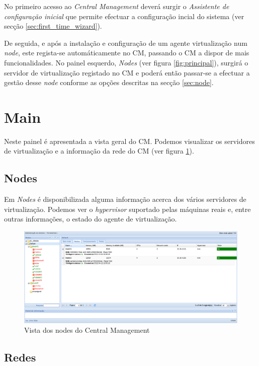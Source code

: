 No primeiro acesso ao \emph{Central Management} deverá surgir o \emph{Assistente de configuração inicial} que permite efectuar a configuração incial do sistema (ver secção \ref{sec:first_time_wizard}).

De seguida, e após a instalação e configuração de um agente virtualização num \emph{node}, este regista-se automáticamente no CM, passando o CM a dispor de mais funcionalidades.
No painel esquerdo, \emph{Nodes} (ver figura \ref{fig:principal}), surgirá o servidor de virtualização registado no CM e poderá então passar-se a efectuar a gestão desse \emph{node} conforme as opções descritas na secção \ref{sec:node}.

\pagebreak

\section{Main}

Neste painel é apresentada a vista geral do CM.
Podemos visualizar os servidores de virtualização e a informação da rede do CM (ver figura \ref{fig:main_nodes}).

\subsection{Nodes}
\label{sub:nodes}

Em \emph{Nodes} é disponibilizada alguma informação acerca dos vários servidores de virtualização. Podemos ver o \emph{hypervisor} suportado pelas máquinas reais e, entre outras informações, o estado do agente de virtualização.
\begin{figure}[H]
	\begin{center}
	\includegraphics[scale=0.45]{screenshots/main_nodes.png}
	\caption{Vista dos nodes do Central Management}
	\label{fig:main_nodes}
	\end{center}
\end{figure}

\subsection{Redes}
\label{sub:redes}

